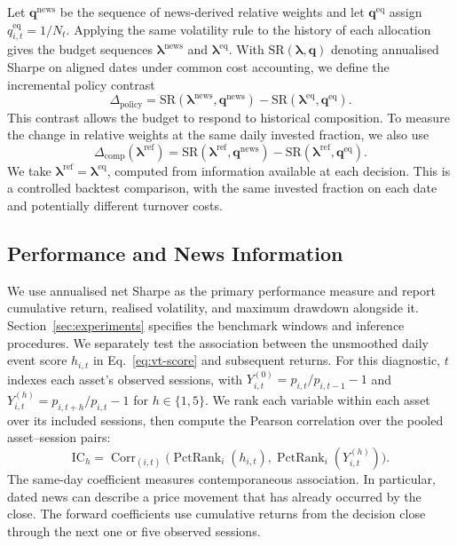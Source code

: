 Let $\boldsymbol{q}^{\mathrm{news}}$ be the sequence of news-derived relative weights and let $\boldsymbol{q}^{\mathrm{eq}}$ assign $q^{\mathrm{eq}}_{i,t}=1/N_t$. Applying the same volatility rule to the history of each allocation gives the budget sequences $\boldsymbol{\lambda}^{\mathrm{news}}$ and $\boldsymbol{\lambda}^{\mathrm{eq}}$. With $\mathrm{SR}(\boldsymbol{\lambda},\boldsymbol{q})$ denoting annualised Sharpe on aligned dates under common cost accounting, we define the incremental policy contrast
\begin{equation}
  \Delta_{\mathrm{policy}}=
    \mathrm{SR}(\boldsymbol{\lambda}^{\mathrm{news}},\boldsymbol{q}^{\mathrm{news}})
    -\mathrm{SR}(\boldsymbol{\lambda}^{\mathrm{eq}},\boldsymbol{q}^{\mathrm{eq}}).
  \label{eq:policy-contrast}
\end{equation}
This contrast allows the budget to respond to historical composition. To measure the change in relative weights at the same daily invested fraction, we also use
\begin{equation}
  \Delta_{\mathrm{comp}}(\boldsymbol{\lambda}^{\mathrm{ref}})=
    \mathrm{SR}(\boldsymbol{\lambda}^{\mathrm{ref}},\boldsymbol{q}^{\mathrm{news}})
    -\mathrm{SR}(\boldsymbol{\lambda}^{\mathrm{ref}},\boldsymbol{q}^{\mathrm{eq}}).
  \label{eq:composition-contrast}
\end{equation}
We take $\boldsymbol{\lambda}^{\mathrm{ref}}=\boldsymbol{\lambda}^{\mathrm{eq}}$, computed from information available at each decision. This is a controlled backtest comparison, with the same invested fraction on each date and potentially different turnover costs.

\subsection{Performance and News Information}

We use annualised net Sharpe as the primary performance measure and report cumulative return, realised volatility, and maximum drawdown alongside it. Section~\ref{sec:experiments} specifies the benchmark windows and inference procedures. We separately test the association between the unsmoothed daily event score $h_{i,t}$ in Eq.~\eqref{eq:vt-score} and subsequent returns. For this diagnostic, $t$ indexes each asset's observed sessions, with $Y^{(0)}_{i,t}=p_{i,t}/p_{i,t-1}-1$ and $Y^{(h)}_{i,t}=p_{i,t+h}/p_{i,t}-1$ for $h\in\{1,5\}$. We rank each variable within each asset over its included sessions, then compute the Pearson correlation over the pooled asset--session pairs:
\begin{equation}
  \mathrm{IC}_h=\operatorname{Corr}_{(i,t)}
     \bigl(\operatorname{PctRank}_i(h_{i,t}),
           \operatorname{PctRank}_i(Y^{(h)}_{i,t})\bigr).
  \label{eq:ic}
\end{equation}
The same-day coefficient measures contemporaneous association. In particular, dated news can describe a price movement that has already occurred by the close. The forward coefficients use cumulative returns from the decision close through the next one or five observed sessions.
